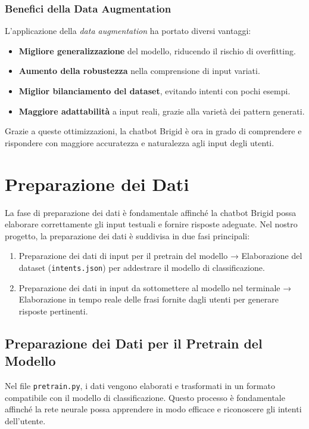\documentclass[12pt, letterpaper]{article}
\begin{document}
\subsubsection{Benefici della Data Augmentation}
L’applicazione della \textit{data augmentation} ha portato diversi vantaggi:
\begin{itemize}
	\item \textbf{Migliore generalizzazione} del modello, riducendo il rischio di overfitting.
	\item \textbf{Aumento della robustezza} nella comprensione di input variati.
	\item \textbf{Miglior bilanciamento del dataset}, evitando intenti con pochi esempi.
	\item \textbf{Maggiore adattabilità} a input reali, grazie alla varietà dei pattern generati.
\end{itemize}
Grazie a queste ottimizzazioni, la chatbot Brigid è ora in grado di comprendere e rispondere con maggiore accuratezza e naturalezza agli input degli utenti.

\newpage
\section{Preparazione dei Dati}

La fase di preparazione dei dati è fondamentale affinché la chatbot Brigid possa elaborare correttamente gli input testuali e fornire risposte adeguate. Nel nostro progetto, la preparazione dei dati è suddivisa in due fasi principali:

\begin{enumerate}
	\item Preparazione dei dati di input per il pretrain del modello → Elaborazione del dataset (\texttt{intents.json}) per addestrare il modello di classificazione.
	\item Preparazione dei dati in input da sottomettere al modello nel terminale → Elaborazione in tempo reale delle frasi fornite dagli utenti per generare risposte pertinenti.
\end{enumerate}

\subsection{Preparazione dei Dati per il Pretrain del Modello}

Nel file \texttt{pretrain.py}, i dati vengono elaborati e trasformati in un formato compatibile con il modello di classificazione. Questo processo è fondamentale affinché la rete neurale possa apprendere in modo efficace e riconoscere gli intenti dell’utente.
\end{document}
